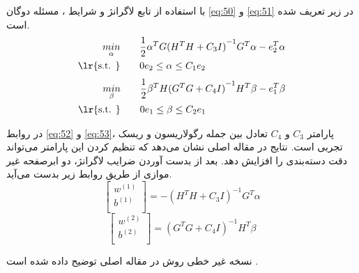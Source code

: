 با استفاده از تابع لاگرانژ و شرایط ، مسئله دوگان \ref{eq:50} و \ref{eq:51} در زیر تعریف شده است. 
\begin{equation}
\begin{split}
\mathop{{ min}}\limits_{\alpha} \qquad & \frac{1}{2}{{\alpha }^{T}}G{{({{H}^{T}}H + C_{3}I)}^{-1}}{{G}^{T}}\alpha -e_{2}^{T}\alpha  \\
\textrm{\lr{s.t. }} \qquad & 0{{e}_{2}}\le \alpha \le {{C}_{1}}{{e}_{2}}
\end{split}
\label{eq:52}
\end{equation}
\begin{equation}
\begin{split}
\mathop{{ min}}\limits_{\beta} \qquad & \frac{1}{2}{{\beta }^{T}}H{{({{G}^{T}}G + C_{4}I)}^{-1}}{{H}^{T}}\beta -e_{1}^{T}\beta  \\
\textrm{\lr{s.t. }} \qquad & 0{{e}_{1}}\le \beta \le {{C}_{2}}{{e}_{1}}
\end{split}
\label{eq:53}
\end{equation}

در روابط \ref{eq:52} و \ref{eq:53}، پارامتر  $C_3$ و  $C_4$ تعادل بین جمله رگولاریسون و ریسک تجربی است. نتایج در مقاله اصلی \cite{shao2011} نشان می‌دهد که تنظیم کردن این پارامتر می‌تواند دقت دسته‌بندی را افزایش دهد. بعد از بدست آوردن ضرایب لاگرانژ، دو ابرصفحه غیر موازی از طریق روابط زیر بدست می‌آید.
\begin{equation}
\left[ \begin{matrix}
{{w}^{(1)}} \\
{{b}^{(1)}} \\
\end{matrix}\right]= -{{({{H}^{T}}H+C_{3}I)}^{-1}}{{G}^{T}}\alpha
\label{eq:54}
\end{equation}
\begin{equation}
\left[ \begin{matrix}
{{w}^{(2)}} \\
{{b}^{(2)}} \\
\end{matrix}\right]= {{({{G}^{T}}G + C_{4}I)}^{-1}}{{H}^{T}}\beta
\label{eq:55}
\end{equation}

نسخه غیر خطی روش  در مقاله اصلی توضیح داده شده است \cite{shao2011}.

